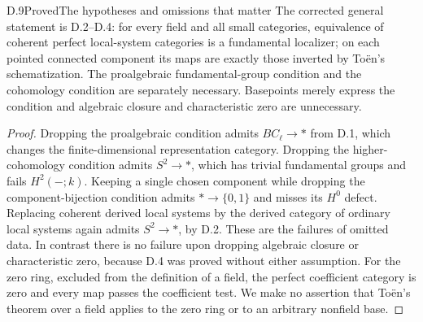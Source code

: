 \begin{claim}{D.9}{Proved}{The hypotheses and omissions that matter}
\label{D9}
The corrected general statement is D.2--D.4: for every field and all
small categories, equivalence of coherent perfect local-system
categories is a fundamental localizer; on each pointed connected
component its maps are exactly those inverted by To\"en's
schematization. The proalgebraic fundamental-group condition and the
cohomology condition are separately necessary. Basepoints merely
express the condition and algebraic closure and characteristic zero
are unnecessary.
\end{claim}
\begin{proof}
Dropping the proalgebraic condition admits $BC_\ell\to *$ from D.1,
which changes the finite-dimensional representation category.
Dropping the higher-cohomology condition admits $S^2\to *$, which
has trivial fundamental groups and fails $H^2(-;k)$. Keeping a
single chosen component while dropping the component-bijection
condition admits $*\to\{0,1\}$ and misses its $H^0$ defect.
Replacing coherent derived local systems by the derived category of
ordinary local systems again admits $S^2\to *$, by D.2. These are
the failures of omitted data. In contrast there is no failure upon
dropping algebraic closure or characteristic zero, because D.4 was
proved without either assumption. For the zero ring, excluded from
the definition of a field, the perfect coefficient category is zero
and every map passes the coefficient test. We make no assertion that
To\"en's theorem over a field applies to the zero ring or to an
arbitrary nonfield base.
\end{proof}

